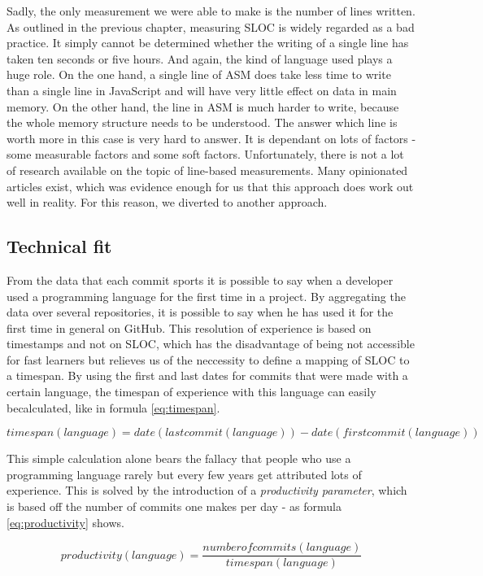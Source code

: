 Sadly, the only measurement we were able to make is the number of lines written.
As outlined in the previous chapter, measuring SLOC is widely regarded as a bad practice.
It simply cannot be determined whether the writing of a single line has taken
ten seconds or five hours. And again, the kind of language used plays a huge role.
On the one hand, a single line of ASM does take less time to write than a single line in JavaScript
and will have very little effect on data in main memory. On the other hand, the line
in ASM is much harder to write, because the whole memory structure needs to be understood.
The answer which line is worth more in this case is very hard to answer.
It is dependant on lots of factors - some measurable factors and some soft factors.
Unfortunately, there is not a lot of research available on the topic of line-based
measurements. Many opinionated articles exist, which was evidence enough for us
that this approach does work out well in reality. For this reason, we diverted to another approach.

\subsection{Technical fit}
From the data that each commit sports it is possible to say when a developer
used a programming language for the first time in a project.
By aggregating the data over several repositories, it is possible to say when
he has used it for the first time in general on GitHub.
This resolution of experience is based on timestamps and not on SLOC,
which has the disadvantage of being not accessible for fast learners
but relieves us of the neccessity to define a mapping of SLOC to a timespan.
By using the first and last dates for commits that were made with a certain language,
the timespan of experience with this language can easily becalculated, like in
formula \ref{eq:timespan}.

\begin{equation}
timespan(language) = date(lastcommit(language)) - date(firstcommit(language))
\label{eq:timespan}
\end{equation}

This simple calculation alone bears the fallacy that people who use a
programming language rarely but every few years get attributed lots
of experience. This is solved by the introduction of a \textit{productivity parameter},
which is based off the number of commits one makes per day - as formula \ref{eq:productivity} shows.

\begin{equation}
productivity(language) = \frac{numberofcommits(language)}{timespan(language)}
\label{eq:productivity}
\end{equation}

